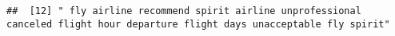 \documentclass[
]{article}
\begin{document}
\begin{verbatim}
##  [12] " fly airline recommend spirit airline unprofessional canceled flight hour departure flight days unacceptable fly spirit"                                                                                                                                                                                                                                                                                                                                                                                                                                                                                                                                                                                                                                                                                                                                                                                                                                                                                                                                                                                                                                                                                                                                                                                                                                                                                                                                                                                                                                                                                                                                                                                                                                                                       

\end{verbatim}
\end{document}
